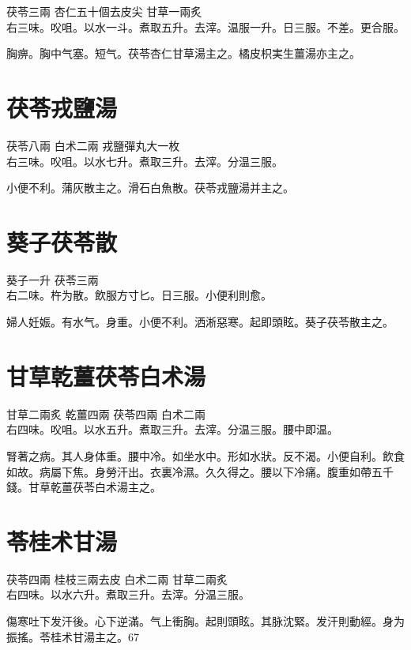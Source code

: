 茯苓{\scriptsize 三兩} 杏仁{\scriptsize 五十個去皮尖} 甘草{\scriptsize 一兩炙}\\
右三味。㕮咀。以水一斗。煮取五升。去滓。温服一升。日三服。不差。更合服。

胸痹。胸中气塞。短气。茯苓杏仁甘草湯主之。橘{\khaaitp 皮}枳{\khaaitp 実生}薑湯亦主之。

\section{茯苓戎鹽湯}

茯苓{\scriptsize 八兩} 白术{\scriptsize 二兩} 戎鹽{\scriptsize 彈丸大一枚}\\
右三味。㕮咀。以水七升。煮取三升。去滓。分温三服。

小便不利。蒲灰散主之。滑石白魚散。茯苓戎鹽湯并主之。

\section{葵子茯苓散}

葵子{\scriptsize 一升} 茯苓{\scriptsize 三兩}\\
右二味。杵为散。飲服方寸匕。日三服。小便利則愈。

{\khaaitp 婦人}妊娠。有水气。身重。小便不利。洒淅惡寒。起即頭眩。葵子茯苓散主之。

\section{甘草乾薑茯苓白术湯}

甘草{\scriptsize 二兩炙} 乾薑{\scriptsize 四兩} 茯苓{\scriptsize 四兩} 白术{\scriptsize 二兩}\\
右四味。㕮咀。以水五升。煮取三升。去滓。分温三服。腰中即温。

腎著之病。其人身体重。腰中冷。如坐水中。形如水狀。反不渴。小便自利。飲食如故。病屬下焦。身勞汗出。衣裏冷濕。久久得之。腰以下冷痛。腹重如帶五千錢。甘{\khaaitp 草乾}薑{\khaaitp 茯}苓{\khaaitp 白}术湯主之。

\section{苓桂术甘湯}

茯苓{\scriptsize 四兩} 桂枝{\scriptsize 三兩去皮} 白术{\scriptsize 二兩} 甘草{\scriptsize 二兩炙}\\
右四味。以水六升。煮取三升。去滓。分温三服。

傷寒吐下发汗後。心下逆滿。气上衝胸。起則頭眩。其脉沈緊。发汗則動經。身为振搖。苓桂术甘湯主之。67

